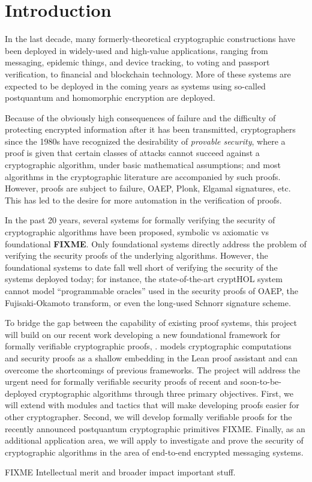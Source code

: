 \section{Introduction}
\label{sec:intro}

In the last decade, many formerly-theoretical cryptographic constructions have been deployed in widely-used and high-value applications, ranging from messaging, epidemic things, and device tracking, to voting and passport verification, to financial and blockchain technology.  More of these systems are expected to be deployed in the coming years as systems using so-called postquantum and homomorphic encryption are deployed.  

Because of the obviously high consequences of failure and the difficulty of protecting encrypted information after it has been transmitted, cryptographers since the 1980s have recognized the desirability of {\em provable security}, where a proof is given that certain classes of attacks cannot succeed against a cryptographic algorithm, under basic mathematical assumptions; and most algorithms in the cryptographic literature are accompanied by such proofs.  However, proofs are subject to failure, OAEP, Plonk, Elgamal signatures, etc. This has led to the desire for more automation in the verification of proofs.

In the past 20 years, several systems for formally verifying the security of cryptographic algorithms have been proposed, symbolic vs axiomatic vs foundational \textbf{FIXME}.  Only foundational systems directly address the problem of verifying the security proofs of the underlying algorithms.  However, the foundational systems to date fall well short of verifying the security of the systems deployed today; for instance, the state-of-the-art cryptHOL system cannot model ``programmable oracles'' used in the security proofs of OAEP, the Fujisaki-Okamoto transform, or even the long-used Schnorr signature scheme.

To bridge the gap between the capability of existing proof systems, this project will build on our recent work developing a new foundational framework for formally verifiable cryptographic proofs, \vcvio.  \vcvio models cryptographic computations and security proofs as a shallow embedding in the Lean proof assistant and can overcome the shortcomings of previous frameworks.  The project will address the urgent need for formally verifiable security proofs of recent and soon-to-be-deployed cryptographic algorithms through three primary objectives.  First, we will extend \vcvio with modules and tactics that will make developing proofs easier for other cryptographer.  Second, we will develop formally verifiable proofs for the recently announced postquantum cryptographic primitives FIXME.  Finally, as an additional application area, we will apply \vcvio to investigate and prove the security of cryptographic algorithms in the area of end-to-end encrypted messaging systems.

FIXME Intellectual merit and broader impact important stuff.